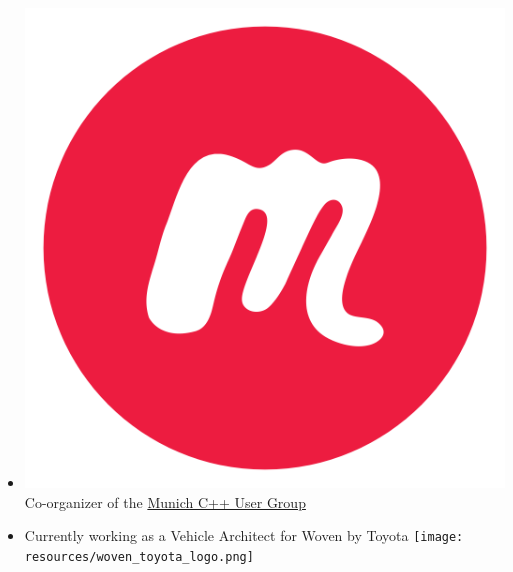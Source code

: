 \documentclass[aspectratio=169]{beamer}
\begin{document}
\begin{frame}[fragile]
\begin{itemize}
    \item \includegraphics[height=.05\textheight]{resources/meetup-icon.png} Co-organizer of the \href{https://www.meetup.com/MUCplusplus/}{Munich C++ User Group}

    \item Currently working as a Vehicle Architect for Woven by Toyota \texttt{[image: resources/woven\_toyota\_logo.png]}

  \end{itemize}
\end{frame}
\end{document}
